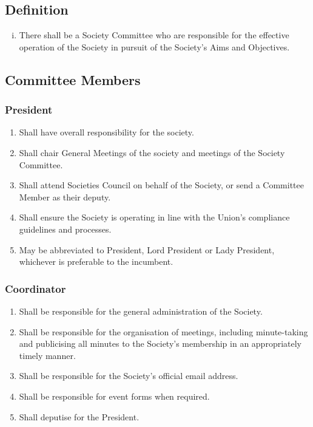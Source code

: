 \subsection{Definition}
\begin{enumerate}[i.]
    \item There shall be a Society Committee who are responsible for the effective operation of the Society in pursuit of the Society’s Aims and Objectives.
\end{enumerate}

\subsection{Committee Members}
\subsubsection{President}
\begin{enumerate}
    \item Shall have overall responsibility for the society.
    \item Shall chair General Meetings of the society and meetings of the Society Committee.
    \item Shall attend Societies Council on behalf of the Society, or send a Committee Member as their deputy.
    \item Shall ensure the Society is operating in line with the Union’s compliance guidelines and processes.
    \item May be abbreviated to President, Lord President or Lady President, whichever is preferable to the incumbent.
\end{enumerate}

\subsubsection{Coordinator}
\begin{enumerate}
    \item Shall be responsible for the general administration of the Society.
    \item Shall be responsible for the organisation of meetings, including minute-taking and publicising all minutes to the Society’s membership in an appropriately timely manner.
    \item Shall be responsible for the Society’s official email address.
    \item Shall be responsible for event forms when required.
    \item Shall deputise for the President.
\end{enumerate}

